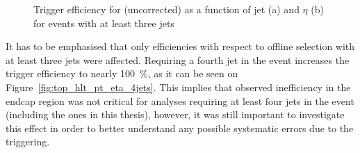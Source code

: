 \begin{figure}[hbtp]
    \centering
{}
\hfill
{}
\caption[Trigger efficiency for \HLTThreeCentralPFJet as a function of jet \pt and $\eta$]{Trigger efficiency for
\HLTThreeCentralPFJet (uncorrected) as a function of jet \pt (a) and $\eta$ (b) for events with at least three jets}
\label{fig:top_hlt_pt_eta_3jets} 
\end{figure}

It has to be emphasised that only efficiencies with respect to offline selection with at least three jets were affected.
Requiring a fourth jet in the event increases the trigger efficiency to nearly \SI{100}{\percent}, as it can be seen
on Figure~\ref{fig:top_hlt_pt_eta_4jets}. This implies that observed inefficiency in the endcap region was not
critical for analyses requiring at least four jets in the event (including the ones in this thesis), however, it was
still important to investigate this effect in order to better understand any possible systematic errors due to the
triggering.

